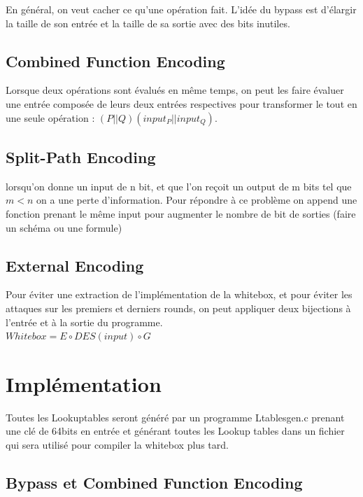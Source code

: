 \documentclass[a4paper,12pt]{article}
\begin{document}
En général, on veut cacher ce qu'une opération fait. L'idée du bypass est d'élargir la taille de son entrée et la taille de sa sortie avec des bits inutiles.


\subsection{Combined Function Encoding}

Lorsque deux opérations sont évalués en même temps, on peut les faire évaluer une entrée composée de leurs deux entrées respectives pour transformer le tout en une seule opération : $(P||Q)(input_P||input_Q)$.

\subsection{Split-Path Encoding}

lorsqu'on donne un input de n bit, et que l'on reçoit un output de m bits tel que $m < n$ on a une perte d'information. Pour répondre à ce problème on append une fonction prenant le même input pour augmenter le nombre de bit de sorties (faire un schéma ou une formule)


\subsection{External Encoding}

Pour éviter une extraction de l'implémentation de la whitebox, et pour éviter les attaques sur les premiers et derniers rounds, on peut appliquer deux bijections à l'entrée et à la sortie du programme.\\

$Whitebox = E \circ DES(input) \circ G$

\newpage

\section{Implémentation}

Toutes les Lookuptables seront généré par un programme Ltablesgen.c prenant une clé de 64bits en entrée et générant toutes les Lookup tables dans un fichier qui sera utilisé pour compiler la whitebox plus tard.

\subsection{Bypass et Combined Function Encoding}
\end{document}
